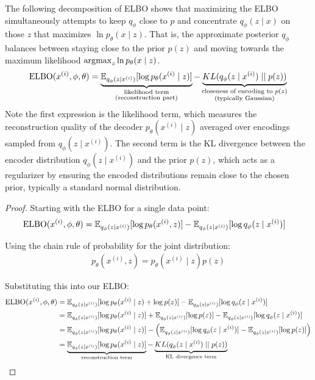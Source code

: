   \begin{corollary}
    The following decomposition of ELBO shows that maximizing the ELBO simultaneously attempts to keep $q_\phi$ close to $p$ and concentrate $q_\phi(z \mid x)$ on those $z$ that maximizes $\ln p_\theta (x \mid z)$. That is, the approximate posterior $q_\phi$ balances between staying close to the prior $p(z)$ and moving towards the maximum likelihood $\argmax_z \ln p_\theta (x \mid z)$. 
    \begin{equation}
      \elbo(x^{(i)}, \phi, \theta) = \underbrace{\mathbb{E}_{q_\phi (z \mid x^{(i)})} [\log p_{\theta} (x^{(i)} \mid z)]}_{\substack{\text{likelihood term} \\ \text{(reconstruction part)}}}- \underbrace{KL(q_{\phi} (z \mid x^{(i)}) \mid\mid p(z))}_{\substack{\text{closeness of encoding to } p(z) \\ \text{(typically Gaussian)}}}
    \end{equation}
    Note the first expression is the likelihood term, which measures the reconstruction quality of the decoder $p_\theta(x^{(i)} \mid z)$ averaged over encodings sampled from $q_\phi(z \mid x^{(i)})$. The second term is the KL divergence between the encoder distribution $q_\phi(z \mid x^{(i)})$ and the prior $p(z)$, which acts as a regularizer by ensuring the encoded distributions remain close to the chosen prior, typically a standard normal distribution.
  \end{corollary}
  \begin{proof}
    Starting with the ELBO for a single data point:
    \begin{align*}
      \elbo(x^{(i)}, \phi, \theta) &= \mathbb{E}_{q_\phi(z \mid x^{(i)})}[\log p_\theta(x^{(i)}, z)] - \mathbb{E}_{q_\phi(z \mid x^{(i)})}[\log q_\phi(z \mid x^{(i)})]
    \end{align*}

    Using the chain rule of probability for the joint distribution:
    \begin{align*}
      p_\theta(x^{(i)}, z) = p_\theta(x^{(i)} \mid z)p(z)
    \end{align*}

    Substituting this into our ELBO:
    \begin{align*}
      \elbo(x^{(i)}, \phi, \theta) &= \mathbb{E}_{q_\phi(z \mid x^{(i)})}[\log p_\theta(x^{(i)} \mid z) + \log p(z)] - \mathbb{E}_{q_\phi(z \mid x^{(i)})}[\log q_\phi(z \mid x^{(i)})] \\
      &= \mathbb{E}_{q_\phi(z \mid x^{(i)})}[\log p_\theta(x^{(i)} \mid z)] + \mathbb{E}_{q_\phi(z \mid x^{(i)})}[\log p(z)] - \mathbb{E}_{q_\phi(z \mid x^{(i)})}[\log q_\phi(z \mid x^{(i)})] \\
      &= \mathbb{E}_{q_\phi(z \mid x^{(i)})}[\log p_\theta(x^{(i)} \mid z)] - \left(\mathbb{E}_{q_\phi(z \mid x^{(i)})}[\log q_\phi(z \mid x^{(i)})] - \mathbb{E}_{q_\phi(z \mid x^{(i)})}[\log p(z)]\right) \\
      &= \underbrace{\mathbb{E}_{q_\phi(z \mid x^{(i)})}[\log p_\theta(x^{(i)} \mid z)]}_{\text{reconstruction term}} - \underbrace{KL(q_\phi(z \mid x^{(i)}) \mid\mid p(z))}_{\text{KL divergence term}}
    \end{align*}
  \end{proof} 

